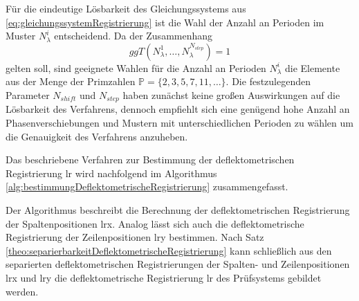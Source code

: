 \p
Für die eindeutige Lösbarkeit des Gleichungssystems aus \ref{eq:gleichungssystemRegistrierung} ist die Wahl der Anzahl an Perioden im Muster $N_\lambda^i$ entscheidend.
Da der Zusammenhang
%
\begin{equation*}
	ggT(N_\lambda^1, \ldots, N_\lambda^{N_{step}}) = 1
\end{equation*}
%
gelten soll, sind geeignete Wahlen für die Anzahl an Perioden $N_\lambda^i$ die Elemente aus der Menge der Primzahlen $\mathbb{P} = \lbrace 2, 3, 5, 7, 11,\ldots\rbrace$.
Die festzulegenden Parameter $N_{shift}$ und $N_{step}$ haben zunächst keine großen Auswirkungen auf die Lösbarkeit des Verfahrens, dennoch empfiehlt sich eine genügend hohe Anzahl an Phasenverschiebungen und Mustern mit unterschiedlichen Perioden zu wählen um die Genauigkeit des Verfahrens anzuheben.

\p
Das beschriebene Verfahren zur Bestimmung der deflektometrischen Registrierung \acrshort{lr} wird nachfolgend im Algorithmus \ref{alg:bestimmungDeflektometrischeRegistrierung} zusammengefasst.

{
	\FloatBarrier
	
}

\noindent
Der Algorithmus beschreibt die Berechnung der deflektometrischen Registrierung der Spaltenpositionen \acrshort{lrx}.
Analog lässt sich auch die deflektometrische Registrierung der Zeilenpositionen \acrshort{lry} bestimmen.
Nach Satz \ref{theo:separierbarkeitDeflektometrischeRegistrierung} kann schließlich aus den separierten deflektometrischen Registrierungen der Spalten- und Zeilenpositionen \acrshort{lrx} und \acrshort{lry} die deflektometrische Registrierung \acrshort{lr} des Prüfsystems gebildet werden.